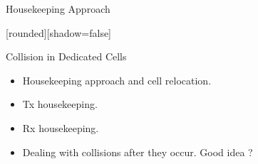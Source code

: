 \begin{withoutheadline}
\begin{frame}{Housekeeping Approach}


[rounded][shadow=false]
\begin{minipage}[t]{0.48\linewidth}

\begin{block}{Collision in Dedicated Cells}
    \begin{itemize}
    \item Housekeeping approach and cell relocation.
    \item Tx housekeeping. 
    \item<4-> Rx housekeeping. 
    \item<6-> Dealing with collisions after they occur. Good idea ?
    

\end{itemize}
\end{block}
\end{minipage}
\end{frame}
\end{withoutheadline}
